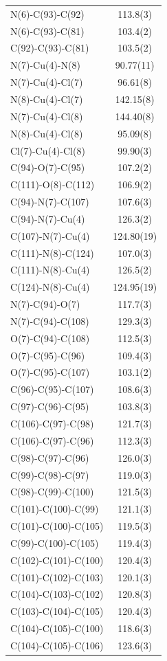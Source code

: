 \begin{center}
{\begin{supertabular}{p{1.5in}c}
N(6)-C(93)-C(92)&113.8(3)\\
N(6)-C(93)-C(81)&103.4(2)\\
C(92)-C(93)-C(81)&103.5(2)\\
N(7)-Cu(4)-N(8)&90.77(11)\\
N(7)-Cu(4)-Cl(7)&96.61(8)\\
N(8)-Cu(4)-Cl(7)&142.15(8)\\
N(7)-Cu(4)-Cl(8)&144.40(8)\\
N(8)-Cu(4)-Cl(8)&95.09(8)\\
Cl(7)-Cu(4)-Cl(8)&99.90(3)\\
C(94)-O(7)-C(95)&107.2(2)\\
C(111)-O(8)-C(112)&106.9(2)\\
C(94)-N(7)-C(107)&107.6(3)\\
C(94)-N(7)-Cu(4)&126.3(2)\\
C(107)-N(7)-Cu(4)&124.80(19)\\
C(111)-N(8)-C(124)&107.0(3)\\
C(111)-N(8)-Cu(4)&126.5(2)\\
C(124)-N(8)-Cu(4)&124.95(19)\\
N(7)-C(94)-O(7)&117.7(3)\\
N(7)-C(94)-C(108)&129.3(3)\\
O(7)-C(94)-C(108)&112.5(3)\\
O(7)-C(95)-C(96)&109.4(3)\\
O(7)-C(95)-C(107)&103.1(2)\\
C(96)-C(95)-C(107)&108.6(3)\\
C(97)-C(96)-C(95)&103.8(3)\\
C(106)-C(97)-C(98)&121.7(3)\\
C(106)-C(97)-C(96)&112.3(3)\\
C(98)-C(97)-C(96)&126.0(3)\\
C(99)-C(98)-C(97)&119.0(3)\\
C(98)-C(99)-C(100)&121.5(3)\\
C(101)-C(100)-C(99)&121.1(3)\\
C(101)-C(100)-C(105)&119.5(3)\\
C(99)-C(100)-C(105)&119.4(3)\\
C(102)-C(101)-C(100)&120.4(3)\\
C(101)-C(102)-C(103)&120.1(3)\\
C(104)-C(103)-C(102)&120.8(3)\\
C(103)-C(104)-C(105)&120.4(3)\\
C(104)-C(105)-C(100)&118.6(3)\\
C(104)-C(105)-C(106)&123.6(3)\\

\end{supertabular}}
\end{center}
